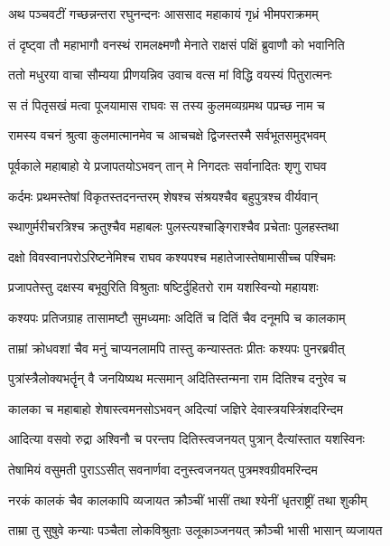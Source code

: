 
\twolineshloka
{अथ पञ्चवटीं गच्छन्नन्तरा रघुनन्दनः}
{आससाद महाकायं गृध्रं भीमपराक्रमम्} %

\twolineshloka
{तं दृष्ट्वा तौ महाभागौ वनस्थं रामलक्ष्मणौ}
{मेनाते राक्षसं पक्षिं ब्रुवाणौ को भवानिति} %

\twolineshloka
{ततो मधुरया वाचा सौम्यया प्रीणयन्निव}
{उवाच वत्स मां विद्धि वयस्यं पितुरात्मनः} %

\twolineshloka
{स तं पितृसखं मत्वा पूजयामास राघवः}
{स तस्य कुलमव्यग्रमथ पप्रच्छ नाम च} %

\twolineshloka
{रामस्य वचनं श्रुत्वा कुलमात्मानमेव च}
{आचचक्षे द्विजस्तस्मै सर्वभूतसमुद्भवम्} %

\twolineshloka
{पूर्वकाले महाबाहो ये प्रजापतयोऽभवन्}
{तान् मे निगदतः सर्वानादितः शृणु राघव} %

\twolineshloka
{कर्दमः प्रथमस्तेषां विकृतस्तदनन्तरम्}
{शेषश्च संश्रयश्चैव बहुपुत्रश्च वीर्यवान्} %

\twolineshloka
{स्थाणुर्मरीचरत्रिश्च क्रतुश्चैव महाबलः}
{पुलस्त्यश्चाङ्गिराश्चैव प्रचेताः पुलहस्तथा} %

\twolineshloka
{दक्षो विवस्वानपरोऽरिष्टनेमिश्च राघव}
{कश्यपश्च महातेजास्तेषामासीच्च पश्चिमः} %

\twolineshloka
{प्रजापतेस्तु दक्षस्य बभूवुरिति विश्रुताः}
{षष्टिर्दुहितरो राम यशस्विन्यो महायशः} %

\twolineshloka
{कश्यपः प्रतिजग्राह तासामष्टौ सुमध्यमाः}
{अदितिं च दितिं चैव दनूमपि च कालकाम्} %

\twolineshloka
{ताम्रां क्रोधवशां चैव मनुं चाप्यनलामपि}
{तास्तु कन्यास्ततः प्रीतः कश्यपः पुनरब्रवीत्} %

\twolineshloka
{पुत्रांस्त्रैलोक्यभर्तॄन् वै जनयिष्यथ मत्समान्}
{अदितिस्तन्मना राम दितिश्च दनुरेव च} %

\twolineshloka
{कालका च महाबाहो शेषास्त्वमनसोऽभवन्}
{अदित्यां जज्ञिरे देवास्त्रयस्त्रिंशदरिन्दम} %

\twolineshloka
{आदित्या वसवो रुद्रा अश्विनौ च परन्तप}
{दितिस्त्वजनयत् पुत्रान् दैत्यांस्तात यशस्विनः} %

\twolineshloka
{तेषामियं वसुमती पुराऽऽसीत् सवनार्णवा}
{दनुस्त्वजनयत् पुत्रमश्वग्रीवमरिन्दम} %

\twolineshloka
{नरकं कालकं चैव कालकापि व्यजायत}
{क्रौञ्चीं भासीं तथा श्येनीं धृतराष्ट्रीं तथा शुकीम्} %

\twolineshloka
{ताम्रा तु सुषुवे कन्याः पञ्चैता लोकविश्रुताः}
{उलूकाञ्जनयत् क्रौञ्ची भासी भासान् व्यजायत} %

